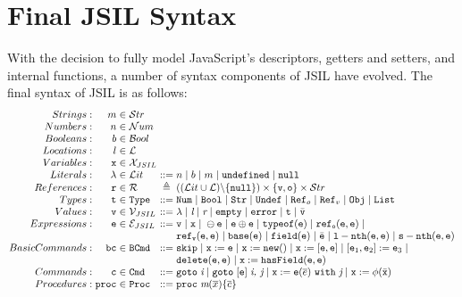 \documentclass[a4paper,11pt,twoside]{report}
\begin{document}
\section{Final JSIL Syntax}\label{sec:finjsilsyntax}
With the decision to fully model JavaScript's descriptors, getters and setters, and internal functions, a number of syntax components of JSIL have evolved. The final syntax of JSIL is as follows:
$$
\arraycolsep=1.5pt
\begin{array}{rrclcl}
Strings : &  m & \in & \mathcal{S}tr \\
Numbers : &  n & \in & \mathcal{N}um \\
Booleans : &  b & \in & \mathcal{B}ool \\
Locations : &  l & \in & \mathcal{L} \\
Variables : &  \mathtt{x} & \in & \mathcal{X}_{JSIL} \\
Literals : &  \mathtt{\lambda} & \in & \mathcal{L}it & ::= & n \myor b \myor m \myor \mathtt{undefined} \myor \mathtt{null} \\
References : &  \mathtt{r} & \in & \mathcal{R} & \triangleq & ((\mathcal{L}it \cup \mathcal{L}) \backslash \{ \mathtt{null} \}) \times \{ \mathtt{v, o} \} \times \mathcal{S}tr\\
Types: & \mathtt{t} & \in & \mathtt{Type} & ::= & \mathtt{Num} \myor \mathtt{Bool} \myor \mathtt{Str} \myor \mathtt{Undef} \myor \mathtt{Ref}_o \myor \mathtt{Ref}_v \myor \mathtt{Obj} \myor \mathtt{List} \\
Values: & \mathtt{v} & \in & \mathcal{V}_{JSIL} & ::= &\lambda \myor \textit{l} \myor \textit{r} \myor \mathtt{empty} \myor \mathtt{error} \myor \mathtt{t} \myor \bar{\mathtt{v}} \\
Expressions: & \mathtt{e} & \in & \mathcal{E}_{JSIL} & ::= &\mathtt{v} \myor \mathtt{x} \myor \ominus \mathtt{e} \myor \mathtt{e} \oplus \mathtt{e} \myor \mathtt{typeof}(\mathtt{e}) \myor \mathtt{ref_o}(\mathtt{e,e}) \myor \\
& & & & & \mathtt{ref_v}(\mathtt{e,e}) \myor \mathtt{base}(\mathtt{e}) \myor \mathtt{field}(\mathtt{e}) \myor \bar{\mathtt{e}} \myor \mathtt{l-nth (e, e)} \myor \mathtt{s-nth (e, e)}
\\
Basic Commands: & \mathtt{bc} & \in & \mathtt{BCmd} & ::= & \mathtt{skip} \myor \mathtt{x} := \mathtt{e} \myor \mathtt{x} := \mathtt{new}() \myor \mathtt{x} := [\mathtt{e,e}] \myor [\mathtt{e}_1,\mathtt{e}_2] := \mathtt{e}_3 \myor  \\
& & & & & \mathtt{delete}(\mathtt{e,e}) \myor \mathtt{x} := \mathtt{hasField}(\mathtt{e,e}) \\
Commands: & \mathtt{c} & \in & \mathtt{Cmd} & ::= & \mathtt{goto} \hspace{3pt} \textit{i} \myor \mathtt{goto} \hspace{3pt} [\mathtt{e}] \hspace{3pt} \textit{i, j} \myor \mathtt{x} := \mathtt{e}(\overline{e})\ \mathtt{with}\ \textit{j} \myor \mathtt{x} := \phi(\bar{\mathtt{x}})
\\
Procedures: & \mathtt{proc} & \in & \mathtt{Proc} & ::= & \mathtt{proc} \hspace{3pt} \textit{m}(\overline{x})\{\overline{c}\}
\end{array}
$$
\end{document}
